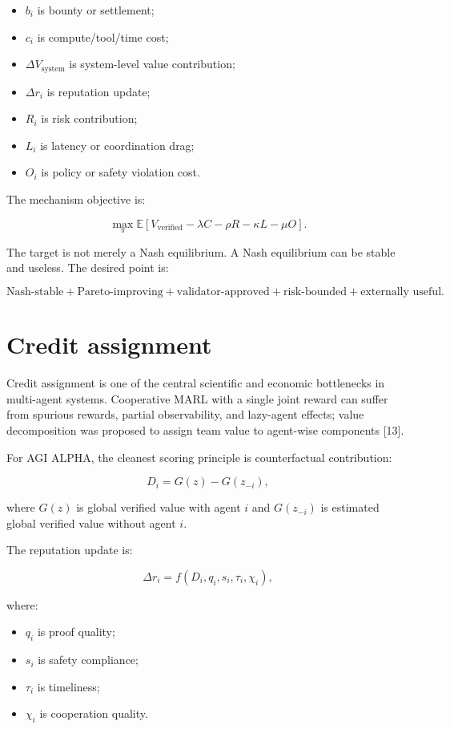 \documentclass[11pt]{article}
\providecommand{\tightlist}{\setlength{\itemsep}{0pt}\setlength{\parskip}{0pt}}
\begin{document}
\begin{itemize}
\tightlist
\item
  \(b_i\) is bounty or settlement;
\item
  \(c_i\) is compute/tool/time cost;
\item
  \(\Delta V_{\text{system}}\) is system-level value contribution;
\item
  \(\Delta r_i\) is reputation update;
\item
  \(R_i\) is risk contribution;
\item
  \(L_i\) is latency or coordination drag;
\item
  \(O_i\) is policy or safety violation cost.
\end{itemize}

The mechanism objective is:

\[
\max_{\pi}\mathbb{E}[V_{\text{verified}}-\lambda C-\rho R-\kappa L-\mu O].
\]

The target is not merely a Nash equilibrium. A Nash equilibrium can be stable and useless. The desired point is:

\[
\text{Nash-stable}+
\text{Pareto-improving}+
\text{validator-approved}+
\text{risk-bounded}+
\text{externally useful}.
\]

\section{Credit assignment}\label{credit-assignment}

Credit assignment is one of the central scientific and economic bottlenecks in multi-agent systems. Cooperative MARL with a single joint reward can suffer from spurious rewards, partial observability, and lazy-agent effects; value decomposition was proposed to assign team value to agent-wise components {[}13{]}.

For AGI ALPHA, the cleanest scoring principle is counterfactual contribution:

\[
D_i=G(z)-G(z_{-i}),
\]

where \(G(z)\) is global verified value with agent \(i\) and \(G(z_{-i})\) is estimated global verified value without agent \(i\).

The reputation update is:

\[
\Delta r_i=f(D_i,q_i,s_i,\tau_i,\chi_i),
\]

where:

\begin{itemize}
\tightlist
\item
  \(q_i\) is proof quality;
\item
  \(s_i\) is safety compliance;
\item
  \(\tau_i\) is timeliness;
\item
  \(\chi_i\) is cooperation quality.
\end{itemize}
\end{document}
